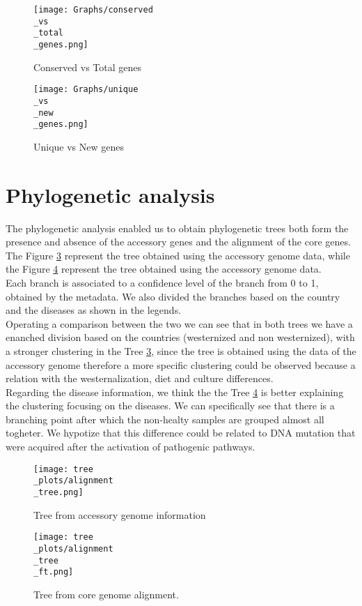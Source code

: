 \documentclass[a4paper,titlepage, oneside]{book}
\begin{document}
\begin{figure}[ht]
\centering
\texttt{[image: Graphs/conserved\\\_vs\\\_total\\\_genes.png]}
\caption{Conserved vs Total genes}
\label{fig:pangenome3}
\end{figure}

\begin{figure}[ht]
\centering
\texttt{[image: Graphs/unique\\\_vs\\\_new\\\_genes.png]}
\caption{Unique vs New genes}
\label{fig:pangenome4}
\end{figure}

\section{Phylogenetic analysis }
The phylogenetic analysis enabled us to obtain phylogenetic trees both form the presence and absence of the accessory genes and the alignment of the core genes.
The Figure \ref{fig:Tree1} represent the tree obtained using the accessory genome data, while the Figure \ref{fig:Tree2} represent the tree obtained using the accessory genome data.\\Each branch is associated to a confidence level of the branch from 0 to 1, obtained by the metadata. We also divided the branches based on the country and the diseases as shown in the legends.
\\Operating a comparison between the two we can see that in both trees we have a enanched division based on the countries (westernized and non westernized), with a stronger clustering in the Tree \ref{fig:Tree1}, since the tree is obtained using the data of the accessory genome therefore a more specific clustering could be observed because a relation with the westernalization, diet and culture differences.
\\Regarding the disease information, we think the the Tree \ref{fig:Tree2} is better explaining the clustering focusing on the diseases. We can specifically see that there is a branching point after which the non-healty samples are grouped almost all togheter. We hypotize that this difference could be related to DNA mutation that were acquired after the activation of pathogenic pathways.

\begin{figure}[ht]
\centering
\texttt{[image: tree\\\_plots/alignment\\\_tree.png]}
\caption{Tree from accessory genome information}
\label{fig:Tree1}
\end{figure}


\begin{figure}[ht]
\centering
\texttt{[image: tree\\\_plots/alignment\\\_tree\\\_ft.png]}
\caption{Tree from core genome alignment.}
\label{fig:Tree2}
\end{figure}
\end{document}
